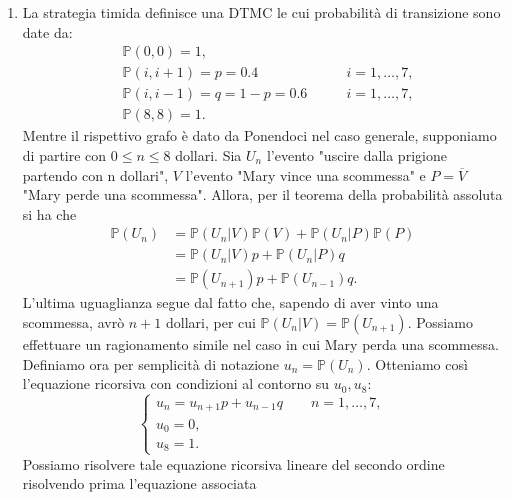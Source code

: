 \documentclass[
	12pt, %
]{fphw}
\begin{document}
\begin{enumerate}
	\item La strategia timida definisce una DTMC le cui probabilità di transizione sono date da:
		\begin{equation*}
			\begin{aligned}
				&\mathbb{P}(0, 0) = 1,	\\
				&\mathbb{P}(i, i+1) = p = 0.4	\qquad &i = 1, \dots, 7,	\\
				&\mathbb{P}(i, i-1) = q = 1-p = 0.6	\qquad &i = 1, \dots, 7,	\\
				&\mathbb{P}(8, 8) = 1.
			\end{aligned}
		\end{equation*}
		Mentre il rispettivo grafo è dato da
		Ponendoci nel caso generale, supponiamo di partire con $0 \leq n \leq 8$ dollari.
		Sia $U_n$ l'evento "uscire dalla prigione partendo con n dollari", $V$ l'evento "Mary vince una scommessa" e $P = \overline{V}$ "Mary perde una scommessa".
		Allora, per il teorema della probabilità assoluta si ha che
		\begin{equation} \label{eq:es3_1}
			\begin{aligned}
				\mathbb{P}(U_n) &= \mathbb{P}(U_n | V)\mathbb{P}(V) + \mathbb{P}(U_n | P)\mathbb{P}(P) \\
					&= \mathbb{P}(U_n | V)p + \mathbb{P}(U_n | P)q \\
					&= \mathbb{P}(U_{n+1})p + \mathbb{P}(U_{n-1}) q.
			\end{aligned}
		\end{equation}
		L'ultima uguaglianza segue dal fatto che, sapendo di aver vinto una scommessa, avrò $n+1$ dollari, per cui $\mathbb{P}(U_n | V) = \mathbb{P}(U_{n+1})$.
		Possiamo effettuare un ragionamento simile nel caso in cui Mary perda una scommessa.
		Definiamo ora per semplicità di notazione $u_n = \mathbb{P}(U_n)$.
		Otteniamo così l'equazione ricorsiva con condizioni al contorno su $u_0, u_8$:
		\begin{equation*}
			\begin{cases}
				u_n = u_{n+1}p + u_{n-1}q \qquad n = 1, \dots, 7, \\
				u_0 = 0, \\
				u_8 = 1.
			\end{cases}
		\end{equation*}
		Possiamo risolvere tale equazione ricorsiva lineare del secondo ordine risolvendo prima l'equazione associata
		\begin{equation*}

\end{equation*}
\end{enumerate}
\end{document}
